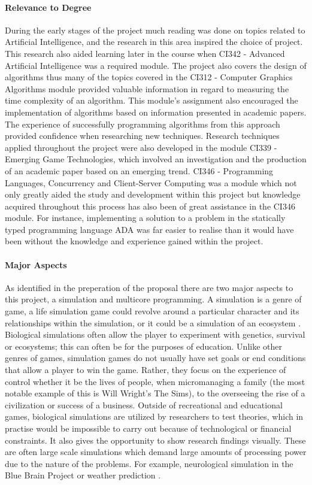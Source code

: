 \documentclass[main.tex]{subfiles}
\begin{document}
\paragraph{Relevance to Degree} During the early stages of the project much reading was done on topics related to Artificial Intelligence, and the research in this area inspired the choice of project. This research also aided learning later in the course when CI342 - Advanced Artificial Intelligence was a required module. The project also covers the design of algorithms thus many of the topics covered in the CI312 - Computer Graphics Algorithms module  provided valuable information in regard to measuring the time complexity of an algorithm. This module's assignment also encouraged the implementation of algorithms based on information presented in academic papers. The experience of successfully programming algorithms from this approach provided confidence when researching new techniques. Research techniques applied throughout the project were also developed in the module CI339 - Emerging Game Technologies, which involved an investigation and the production of an academic paper based on an emerging trend. CI346 - Programming Languages, Concurrency and Client-Server Computing was a module which not only greatly aided the study and development within this project but knowledge acquired throughout this process has also been of great assistance in the CI346 module. For instance, implementing a solution to a problem in the statically typed programming language ADA was far easier to realise than it would have been without the knowledge and experience gained within the project.

\paragraph{Major Aspects}
As identified in the preperation of the proposal there are two major aspects to this project, a simulation and multicore programming. A simulation is a genre of game, a life simulation game could revolve around a particular character and its relationships within the simulation, or it could be a simulation of an ecosystem \cite{Spore2009}. Biological simulations often allow the player to experiment with genetics, survival or ecosystems; this can often be for the purposes of education. Unlike other genres of games, simulation games do not usually have set goals or end conditions that allow a player to win the game. Rather, they focus on the experience of control whether it be the lives of people, when micromanaging a family (the most notable example of this is Will Wright's The Sims), to the overseeing the rise of a civilization or success of a business. Outside of recreational and educational games, biological simulations are utilized by researchers to test theories, which in practise would be impossible to carry out because of technological or financial constraints. It also gives the opportunity to show research findings visually. These are often large scale simulations which demand large amounts of processing power due to the nature of the problems. For example, neurological simulation in the Blue Brain Project\cite{Graham-Rowe2005} or weather prediction \cite{Michalakes2008}.
\end{document}
